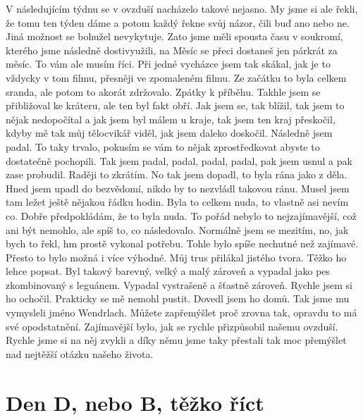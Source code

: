 V následujícím týdnu se v ovzduší nacházelo takové nejasno. My jsme si ale řekli, že tomu ten týden dáme a potom každý řekne svůj názor, čili buď ano nebo ne. Jiná možnost se bohužel nevykytuje. Zato jsme měli spousta času v soukromí, kterého jsme následně dostivyužili, na Měsíc se přeci dostaneš jen párkrát za měsíc. To vám ale musím říci. Při jedné vycházce jsem tak skákal, jak je to vždycky v tom filmu, přesněji ve zpomaleném filmu. Ze začátku to byla celkem sranda, ale potom to akorát zdržovalo. Zpátky k příběhu. Takhle jsem se přibližoval ke kráteru, ale ten byl fakt obří. Jak jsem se, tak blížil, tak jsem to nějak nedopočítal a jak jsem byl málem u kraje, tak jsem ten kraj přeskočil, kdyby mě tak můj tělocvikář viděl, jak jsem daleko doskočil. Následně jsem padal. To taky trvalo, pokusím se vám to nějak zprostředkovat abyste to dostatečně pochopili. Tak jsem padal, padal, padal, padal, pak jsem usnul a pak zase probudil. Raději to zkrátím. No tak jsem dopadl, to byla rána jako z děla. Hned jsem upadl do bezvědomí, nikdo by to nezvládl takovou ránu. Musel jsem tam ležet ještě nějakou řádku hodin. Byla to celkem nuda, to vlastně asi nevím co. Dobře předpokládám, že to byla nuda. To pořád nebylo to nejzajímavější, což ani být nemohlo, ale spíš to, co následovalo. Normálně jsem se mezitím, no, jak bych to řekl, hm prostě vykonal potřebu. Tohle bylo spíše nechutné než zajímavé. Přesto to bylo možná i více výhodné. Můj trus přilákal jistého tvora. Těžko ho lehce popsat. Byl takový barevný, velký a malý zároveň a vypadal jako pes zkombinovaný s leguánem. Vypadal vystrašeně a šťastně zároveň. Rychle jsem si ho ochočil. Prakticky se mě nemohl pustit. Dovedl jsem ho domů. Tak jsme mu vymysleli jméno Wendrlach. Můžete zapřemýšlet proč zrovna tak, opravdu to má své opodstatnění. Zajímavější bylo, jak se rychle přizpůsobil našemu ovzduší. Rychle jsme si na něj zvykli a díky němu jsme taky přestali tak moc přemýšlet nad nejtěžší otázku našeho života.

\section{Den D, nebo B, těžko říct}


